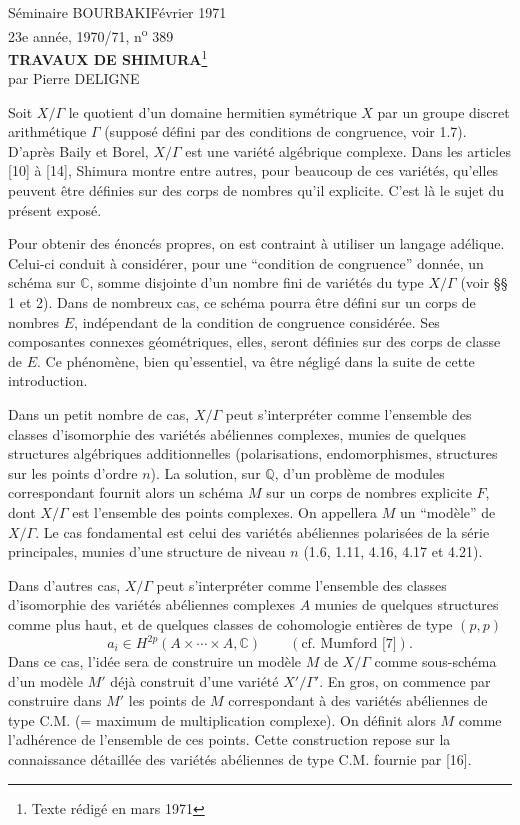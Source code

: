 \documentclass[10pt]{article}
\newcommand{\C}{\mathbb C}
\newcommand{\Q}{\mathbb Q}
\begin{document}
\begin{center}
Séminaire BOURBAKI\hfill Février 1971\\
23e année, 1970/71, n\textsuperscript{o} 389\\[2.2em]
{\Large\bfseries TRAVAUX DE SHIMURA}\footnote{Texte rédigé en mars 1971}\\[1.2em]
par Pierre DELIGNE
\end{center}

Soit $X/\Gamma$ le quotient d'un domaine hermitien symétrique $X$ par un groupe discret arithmétique $\Gamma$ (supposé défini par des conditions de congruence, voir 1.7). D'après Baily et Borel, $X/\Gamma$ est une variété algébrique complexe. Dans les articles [10] à [14], Shimura montre entre autres, pour beaucoup de ces variétés, qu'elles peuvent être définies sur des corps de nombres qu'il explicite. C'est là le sujet du présent exposé.

Pour obtenir des énoncés propres, on est contraint à utiliser un langage adélique. Celui-ci conduit à considérer, pour une ``condition de congruence'' donnée, un schéma sur $\C$, somme disjointe d'un nombre fini de variétés du type $X/\Gamma$ (voir §§ 1 et 2). Dans de nombreux cas, ce schéma pourra être défini sur un corps de nombres $E$, indépendant de la condition de congruence considérée. Ses composantes connexes géométriques, elles, seront définies sur des corps de classe de $E$. Ce phénomène, bien qu'essentiel, va être négligé dans la suite de cette introduction.

Dans un petit nombre de cas, $X/\Gamma$ peut s'interpréter comme l'ensemble des classes d'isomorphie des variétés abéliennes complexes, munies de quelques structures algébriques additionnelles (polarisations, endomorphismes, structures sur les points d'ordre $n$). La solution, sur $\Q$, d'un problème de modules correspondant fournit alors un schéma $M$ sur un corps de nombres explicite $F$, dont $X/\Gamma$ est l'ensemble des points complexes. On appellera $M$ un ``modèle'' de $X/\Gamma$. Le cas fondamental est celui des variétés abéliennes polarisées de la série principales, munies d'une structure de niveau $n$ (1.6, 1.11, 4.16, 4.17 et 4.21).

Dans d'autres cas, $X/\Gamma$ peut s'interpréter comme l'ensemble des classes d'isomorphie des variétés abéliennes complexes $A$ munies de quelques structures comme plus haut, et de quelques classes de cohomologie entières de type $(p,p)$
\[
a_i\in H^{2p}(A\times\cdots\times A,\C) \qquad (\text{cf. Mumford [7]}).
\]
Dans ce cas, l'idée sera de construire un modèle $M$ de $X/\Gamma$ comme sous-schéma d'un modèle $M'$ déjà construit d'une variété $X'/\Gamma'$. En gros, on commence par construire dans $M'$ les points de $M$ correspondant à des variétés abéliennes de type C.M. (= maximum de multiplication complexe). On définit alors $M$ comme l'adhérence de l'ensemble de ces points. Cette construction repose sur la connaissance détaillée des variétés abéliennes de type C.M. fournie par [16].
\end{document}
